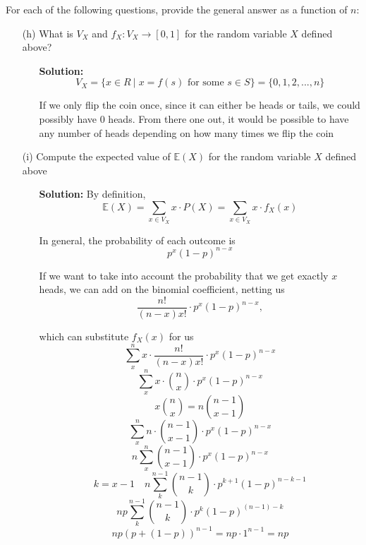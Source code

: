 \documentclass[hidelinks]{article}
\begin{document}
For each of the following questions, provide the general answer as a function of $n$:
    \begin{itemize}
    \item[(h)] What is $V_X$ and $f_X : V_X \rightarrow [0, 1]$ for the random variable $X$ defined above? 
   \begin{itemize}
       \item[ ] \textbf{Solution: } 
           \[
               V_X = \{x \in R\ | \; x= f(s) \text{ for some }s \in S \} = \{
                0, 1, 2, ... ,n
               \}
           \]
        \item[ ] If we only flip the coin once, since it can either be heads or tails, we could possibly have 0 heads. From there one out, it would be possible to have any number of heads depending on how many times we flip the coin
    \end{itemize}
    \item[(i)] Compute the expected value of $\mathbb{E}(X)$ for the random variable $X$ defined above 
   \begin{itemize}
       \item[ ] \textbf{Solution: }By definition, 
           \[
               \mathbb{E}(X) = \sum_{x \in V_X} x \cdot P(X) = \sum_{x \in V_X} x \cdot f_X(x)
           \]
        \item[ ] In general, the probability of each outcome is 
        \[
            p^x (1-p)^{n - x}
        \]
    \item[ ] If we want to take into account the probability that we get exactly $x$ heads, we can add on the binomial coefficient, netting us 
        \[
            \frac{n!}{(n-x)x!}\cdot  p^x (1-p)^{n - x}, 
        \]
    \item[] which can substitute $f_X(x)$ for us
        \[
            \sum_{x}^n x \cdot \frac{n!}{(n-x)x!}\cdot  p^x (1-p)^{n - x} 
        \]
    \[
    \sum_{x}^n x \cdot \binom{n}{x}\cdot  p^x (1-p)^{n - x} 
\]
\[
    x\binom{n}{x} = n \binom{n-1}{x-1}
\]
\[
    \sum_{x}^n n \cdot \binom{n-1}{x-1}\cdot  p^x (1-p)^{n - x} 
\]
\[
    n \sum_{x}^n \binom{n-1}{x-1}\cdot  p^x (1-p)^{n - x} 
\]
\[
    k = x - 1 \quad 
    n \sum_{k}^{n-1} \binom{n-1}{k}\cdot  p^{k+1} (1-p)^{n - k - 1} 
\]
\[
    np \sum_{k}^{n-1} \binom{n-1}{k}\cdot  p^{k} (1-p)^{(n-1) - k} 
\]
\[
    np (p + (1 - p))^{n-1} = np 
    \cdot 1^{n - 1} = np
\]


\end{itemize}
\end{itemize}
\end{document}
